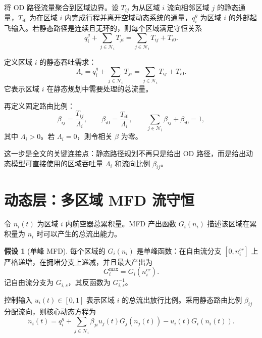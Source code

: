\documentclass[a4paper,12pt]{article}
\theoremstyle{plain}
\theoremstyle{definition}
\newtheorem{assumption}[proposition]{假设}
\theoremstyle{remark}
\begin{document}
将 OD 路径流量聚合到区域边界。设 $T_{ij}$ 为从区域 $i$ 流向相邻区域 $j$ 的静态通量，$T_{i0}$ 为在区域 $i$ 内完成行程并离开空域动态系统的通量，$q_i^g$ 为区域 $i$ 的外部起飞输入。若静态路径是连续且无环的，则每个区域满足守恒关系
\begin{equation}\label{eq:core_static_conservation}
    q_i^g+\sum_{j\in\mathcal N_i}T_{ji}
    =
    \sum_{j\in\mathcal N_i}T_{ij}+T_{i0}.
\end{equation}

定义区域 $i$ 的静态吞吐需求：
\begin{equation}\label{eq:core_lambda}
    \Lambda_i
    =
    q_i^g+\sum_{j\in\mathcal N_i}T_{ji}
    =
    \sum_{j\in\mathcal N_i}T_{ij}+T_{i0}.
\end{equation}
它表示区域 $i$ 在静态规划中需要处理的总流量。

再定义固定路由比例：
\begin{equation}\label{eq:core_beta}
    \beta_{ij}=\frac{T_{ij}}{\Lambda_i},
    \qquad
    \beta_{i0}=\frac{T_{i0}}{\Lambda_i},
    \qquad
    \sum_{j\in\mathcal N_i}\beta_{ij}+\beta_{i0}=1,
\end{equation}
其中 $\Lambda_i>0$。若 $\Lambda_i=0$，则令相关 $\beta$ 为零。

这一步是全文的关键连接点：静态路径规划不再只是给出 OD 路径，而是给出动态模型可直接使用的区域吞吐量 $\Lambda_i$ 和流向比例 $\beta_{ij}$。

\section{动态层：多区域 MFD 流守恒}

令 $n_i(t)$ 为区域 $i$ 内航空器总累积量。MFD 产出函数 $G_i(n_i)$ 描述该区域在累积量为 $n_i$ 时可以产生的总流出能力。

\begin{assumption}[单峰 MFD]\label{asm:core_mfd}
每个区域的 $G_i(n_i)$ 是单峰函数：在自由流分支 $[0,n_i^{cr}]$ 上严格递增，在拥堵分支上递减，并且最大产出为
\[
    G_i^{\max}=G_i(n_i^{cr}).
\]
记自由流分支为 $G_{i,s}$，其反函数为 $G_{i,s}^{-1}$。
\end{assumption}

控制输入 $u_i(t)\in[0,1]$ 表示区域 $i$ 的总流出放行比例。采用静态路由比例 $\beta_{ij}$ 分配流向，则核心动态方程为
\begin{equation}\label{eq:core_dynamics}
    \dot n_i(t)
    =
    q_i^g
    +
    \sum_{j\in\mathcal N_i}\beta_{ji}u_j(t)G_j(n_j(t))
    -
    u_i(t)G_i(n_i(t)).
\end{equation}
\end{document}
